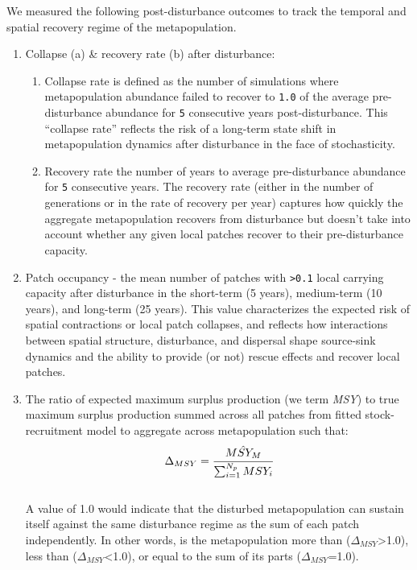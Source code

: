 \documentclass[]{article}
\providecommand{\tightlist}{%
  \setlength{\itemsep}{0pt}\setlength{\parskip}{0pt}}
\begin{document}
We measured the following post-disturbance outcomes to track the
temporal and spatial recovery regime of the metapopulation.

\begin{enumerate}
\def\labelenumi{\arabic{enumi}.}
\item
  Collapse (a) \& recovery rate (b) after disturbance:

  \begin{enumerate}
  \def\labelenumii{\alph{enumii}.}
  \tightlist
  \item
    Collapse rate is defined as the number of simulations where
    metapopulation abundance failed to recover to \texttt{1.0} of the
    average pre-disturbance abundance for \texttt{5} consecutive years
    post-disturbance. This ``collapse rate'' reflects the risk of a
    long-term state shift in metapopulation dynamics after disturbance
    in the face of stochasticity.
  \item
    Recovery rate the number of years to average pre-disturbance
    abundance for \texttt{5} consecutive years. The recovery rate
    (either in the number of generations or in the rate of recovery per
    year) captures how quickly the aggregate metapopulation recovers
    from disturbance but doesn't take into account whether any given
    local patches recover to their pre-disturbance capacity.
  \end{enumerate}
\item
  Patch occupancy - the mean number of patches with
  \texttt{\textgreater{}0.1} local carrying capacity after disturbance
  in the short-term (5 years), medium-term (10 years), and long-term (25
  years). This value characterizes the expected risk of spatial
  contractions or local patch collapses, and reflects how interactions
  between spatial structure, disturbance, and dispersal shape
  source-sink dynamics and the ability to provide (or not) rescue
  effects and recover local patches.
\item
  The ratio of expected maximum surplus production (we term \emph{MSY})
  to true maximum surplus production summed across all patches from
  fitted stock-recruitment model to aggregate across metapopulation such
  that:\\
  \begin{align}
  \Delta_{MSY}=\cfrac{\hat{MSY_M}}{\sum_{i=1}^{N_p} MSY_{i}}
  \end{align}\\
  A value of 1.0 would indicate that the disturbed metapopulation can
  sustain itself against the same disturbance regime as the sum of each
  patch independently. In other words, is the metapopulation more than
  (\(\Delta_{MSY}\)\textgreater{}1.0), less than
  (\(\Delta_{MSY}\)\textless{}1.0), or equal to the sum of its parts
  (\(\Delta_{MSY}\)=1.0).
\end{enumerate}
\end{document}
